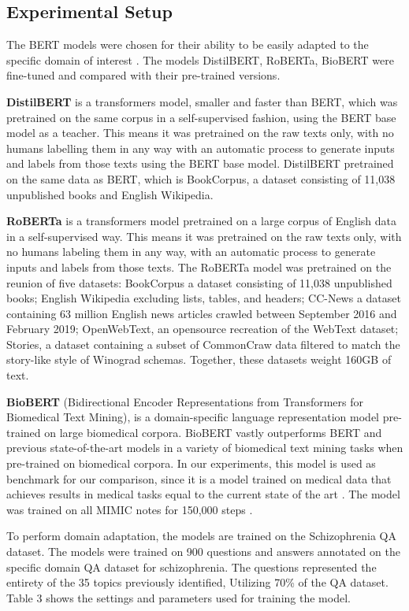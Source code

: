 \documentclass[runningheads]{llncs}
\begin{document}
\subsection{Experimental Setup}\label{sec:setup}
The BERT models were chosen for their ability to be easily adapted to the specific domain of interest \cite{c6,c7,c6,c9}. The models DistilBERT, RoBERTa, BioBERT were fine-tuned and compared with their pre-trained versions. 

\textbf{DistilBERT} is a transformers model, smaller and faster than BERT, which was pretrained on the same corpus in a self-supervised fashion, using the BERT base model as a teacher\cite{c29}. This means it was pretrained on the raw texts only, with no humans labelling them in any way with an automatic process to generate inputs and labels from those texts using the BERT base model. DistilBERT pretrained on the same data as BERT, which is BookCorpus, a dataset consisting of 11,038 unpublished books and English Wikipedia\cite{c29}.

\textbf{RoBERTa} is a transformers model pretrained on a large corpus of English data in a self-supervised way. This means it was pretrained on the raw texts only, with no humans labeling them in any way, with an automatic process to generate inputs and labels from those texts\cite{c24}. The RoBERTa model was pretrained on the reunion of five datasets: BookCorpus a dataset consisting of 11,038 unpublished books; English Wikipedia excluding lists, tables, and headers; CC-News a dataset containing 63 million English news articles crawled between September 2016 and February 2019; OpenWebText, an opensource recreation of the WebText dataset; Stories, a dataset containing a subset of CommonCraw data filtered to match the story-like style of Winograd schemas. Together, these datasets weight 160GB of text.

\textbf{BioBERT} (Bidirectional Encoder Representations from Transformers for Biomedical Text Mining), is a domain-specific language representation model pre-trained on large biomedical corpora.
BioBERT vastly outperforms BERT and previous state-of-the-art models in a variety of biomedical text mining tasks when pre-trained on biomedical corpora.
In our experiments, this model is used as benchmark for our comparison, since it is a model trained on medical data that achieves results in medical tasks equal to the current state of the art \cite{c39}. The model was trained on all MIMIC notes for 150,000 steps \cite{c39}.

To perform domain adaptation, the models are trained on the Schizophrenia QA dataset. The models were trained on 900 questions and answers annotated on the specific domain QA dataset for schizophrenia. The questions represented the entirety of the 35 topics previously identified, Utilizing 70\% of the QA dataset.
Table 3 shows the settings and parameters used for training the model.
\end{document}
